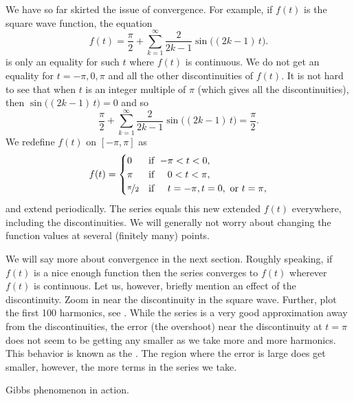 We have so far skirted the issue of convergence.  For example,
if $f(t)$ is the square wave function,
the equation
\begin{equation*}
f(t) = 
\frac{\pi}{2} + \sum_{k=1}^\infty
\frac{2}{2k-1} 
\sin \bigl( (2k-1)\, t \bigr) .
\end{equation*}
is only an equality for such $t$ where $f(t)$ is continuous.
We do not get an equality for $t=-\pi,0,\pi$ and all the other discontinuities
of $f(t)$.  It is not hard to see that when $t$ is an integer multiple of
$\pi$ (which gives all the discontinuities), then
$\sin \bigl( (2k-1)\, t \bigr) = 0$ and so
\begin{equation*}
\frac{\pi}{2} + \sum_{k=1}^\infty
\frac{2}{2k-1} 
\sin \bigl( (2k-1)\, t \bigr) = \frac{\pi}{2} .
\end{equation*}
We redefine $f(t)$ on $[-\pi,\pi]$ as
\begin{equation*}
f(t) =
\begin{cases}
0 & \text{if } \; {-\pi} < t < 0 , \\
\pi & \text{if } \; \phantom{-}0 < t < \pi , \\
\nicefrac{\pi}{2} & \text{if } \; \phantom{-}t = -\pi, 
t = 0,\text{ or }
t = \pi,
\end{cases}
\end{equation*}
and extend periodically.
The series equals this new extended $f(t)$ everywhere, including the
discontinuities.
We will generally not worry about changing the function values
at several (finitely many) points.

We will say more about convergence in the next section.
Roughly speaking,
if $f(t)$ is a nice enough function then the series
converges to $f(t)$ wherever $f(t)$ is continuous.  Let us, however,
briefly mention an effect of the discontinuity.  Zoom in near the
discontinuity in the square wave.  Further, plot the first 100
harmonics, see
.  While the
series is a very good approximation away from the discontinuities, the error
(the overshoot)
near the discontinuity at $t=\pi$ does not seem to be getting any smaller
as we take more and more harmonics.
This behavior is known as the \emph{}.
The region where the error is large does get smaller, however, the more
terms in the series we take.

\begin{myfig}
\capstart
{}
\caption{Gibbs phenomenon in action.\label{ts:squarewavegibbsfig}}
\end{myfig}

